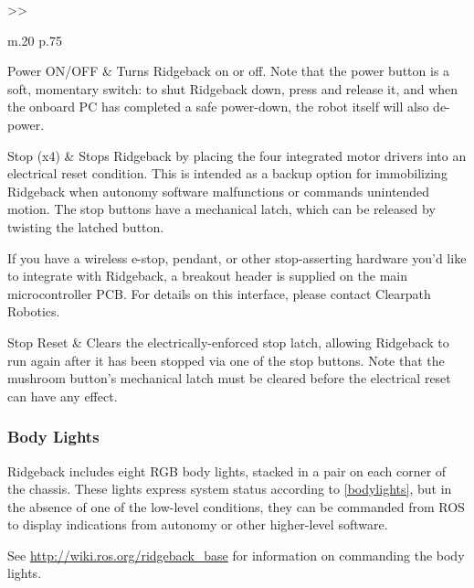 \documentclass[]{clearpath-latex/clearpath-manual}
\begin{document}
\bgroup
\def\arraystretch{1.2}%
\begin{table}[h]
	\centering
	\begin{tabular}{>{}>{\raggedright}m{.20\textwidth} p{.75\textwidth}} \hline

	Power ON/OFF & Turns Ridgeback on or off. Note that the power button is a soft, momentary switch: to shut Ridgeback down, press and release it, and when the onboard PC has completed a safe power-down, the robot itself will also de-power. \\ \hline

	Stop (x4) & Stops Ridgeback by placing the four integrated motor drivers into an electrical reset condition. This is intended as a backup option for immobilizing Ridgeback when autonomy software malfunctions or commands unintended motion. The stop buttons have a mechanical latch, which can be released by twisting the latched button.

	If you have a wireless e-stop, pendant, or other stop-asserting hardware you'd like to integrate with Ridgeback, a breakout header is supplied on the main microcontroller PCB. For details on this interface, please contact Clearpath Robotics. \\ \hline

	Stop Reset & Clears the electrically-enforced stop latch, allowing Ridgeback to run again after it has been stopped via one of the stop buttons. Note that the mushroom button's mechanical latch must be cleared before the electrical reset can have any effect. \\ \hline
	\end{tabular}
\newline
\caption{Ridgeback Rear Buttons}
\label{rearbuttons}
\end{table}
\egroup


\pagebreak[4]
\subsubsection{Body Lights}

Ridgeback includes eight RGB body lights, stacked in a pair on each corner of the chassis. These lights express system status according to \autoref{bodylights}, but in the absence of one of the low-level conditions, they can be commanded from ROS to display indications from autonomy or other higher-level software.

See \url{http://wiki.ros.org/ridgeback_base} for information on commanding the body lights.
\end{document}
